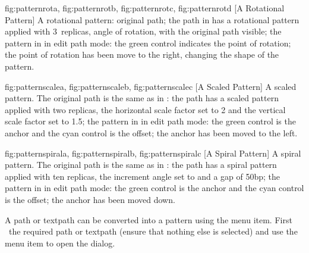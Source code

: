 {
  {fig:patternrota}{}{},
  {fig:patternrotb}{}{},
  {fig:patternrotc}{}{},
  {fig:patternrotd}{}{}
}
[A Rotational Pattern]
{A rotational pattern: 
 original path; 
 the path 
in  has a rotational pattern applied with 3~replicas, 
 angle of rotation, with the original path visible; 
 the pattern 
in  in edit path mode:
the green control indicates the point of rotation;
 the
point of rotation has been move to the right, changing the shape of
the pattern.}

{
  {fig:patternscalea}{}{},
  {fig:patternscaleb}{}{},
  {fig:patternscalec}{}{}
}
[A Scaled Pattern]
{A scaled pattern. The original path is the same as in
:
 the path has a scaled pattern applied with two replicas, 
the horizontal scale factor set to 2 and the vertical scale factor 
set to 1.5;
 the pattern 
in  in edit path mode: the green control is
the anchor and the cyan control is the offset;
 the anchor has been moved to the left.}

{
  {fig:patternspirala}{}{},
  {fig:patternspiralb}{}{},
  {fig:patternspiralc}{}{}
}
[A Spiral Pattern]
{A spiral pattern. The original path is the same as in
:
 the path has a
spiral pattern applied with ten replicas, the increment angle set
to  and a gap of 50bp; 
 the pattern 
in  in edit path mode: the green control is
the anchor and the cyan control is the offset;
 the anchor has been moved down.}


A \gls{path} or \gls{textpath} can be converted into a pattern using
the  menu item. First \select\ the
required \gls{path} or \gls{textpath} (ensure that nothing else is
selected) and use the  menu item to open
the  dialog.

